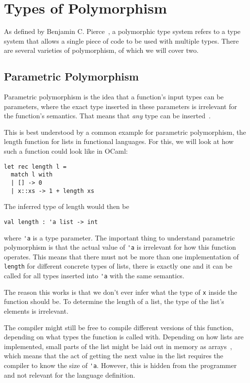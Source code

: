 \section{Types of Polymorphism}

As defined by Benjamin C. Pierce~\cite[Chapter~23.2]{pierce-types}, a polymorphic type system refers to a type system that allows a single piece of code to be used with multiple types. There are several varieties of polymorphism, of which we will cover two.

\subsection{Parametric Polymorphism}

Parametric polymorphism is the idea that a function's input types can be parameters, where the exact type inserted in these parameters is irrelevant for the function's semantics. That means that \textit{any} type can be inserted~\cite[Chapter~23.2]{pierce-types}.

This is best understood by a common example for parametric polymorphism, the length function for lists in functional languages. For this, we will look at how such a function could look like in OCaml:
\begin{verbatim}
let rec length l =
  match l with
  | [] -> 0
  | x::xs -> 1 + length xs
\end{verbatim}
The inferred type of length would then be
\begin{verbatim}
val length : 'a list -> int
\end{verbatim}
where \verb|'a| is a type parameter. The important thing to understand parametric polymorphism is that the actual value of \verb|'a| is irrelevant for how this function operates. This means that there must not be more than one implementation of \verb|length| for different concrete types of lists, there is exactly one and it can be called for all types inserted into \verb|'a| with the same semantics.

The reason this works is that we don't ever infer what the type of \verb|x| inside the function should be. To determine the length of a list, the type of the list's elements is irrelevant.

The compiler might still be free to compile different versions of this function, depending on what types the function is called with. Depending on how lists are implemented, small parts of the list might be laid out in memory as arrays~\cite{functional-lists}, which means that the act of getting the next value in the list requires the compiler to know the size of \verb|'a|. However, this is hidden from the programmer and not relevant for the language definition.

